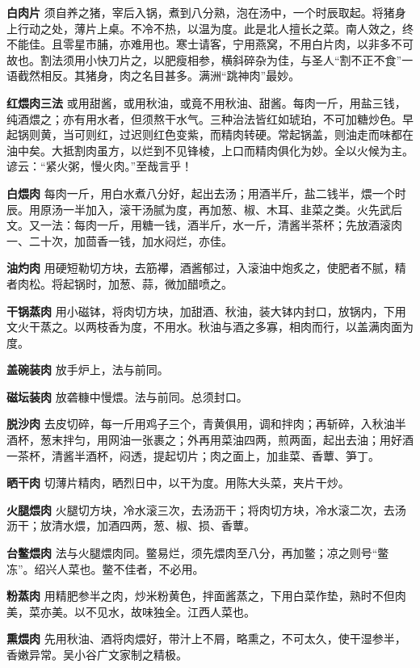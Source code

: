 \documentclass[]{article}
\begin{document}
\textbf{白肉片}
须自养之猪，宰后入锅，煮到八分熟，泡在汤中，一个时辰取起。将猪身上行动之处，薄片上桌。不冷不热，以温为度。此是北人擅长之菜。南人效之，终不能佳。且零星市脯，亦难用也。寒士请客，宁用燕窝，不用白片肉，以非多不可故也。割法须用小快刀片之，以肥瘦相参，横斜碎杂为佳，与圣人``割不正不食''一语截然相反。其猪身，肉之名目甚多。满洲``跳神肉''最妙。

\textbf{红煨肉三法}
或用甜酱，或用秋油，或竟不用秋油、甜酱。每肉一斤，用盐三钱，纯酒煨之；亦有用水者，但须熬干水气。三种治法皆红如琥珀，不可加糖炒色。早起锅则黄，当可则红，过迟则红色变紫，而精肉转硬。常起锅盖，则油走而味都在油中矣。大抵割肉虽方，以烂到不见锋棱，上口而精肉俱化为妙。全以火候为主。谚云：``紧火粥，慢火肉。''至哉言乎！

\textbf{白煨肉}
每肉一斤，用白水煮八分好，起出去汤；用酒半斤，盐二钱半，煨一个时辰。用原汤一半加入，滚干汤腻为度，再加葱、椒、木耳、韭菜之类。火先武后文。又一法：每肉一斤，用糖一钱，酒半斤，水一斤，清酱半茶杯；先放酒滚肉一、二十次，加茴香一钱，加水闷烂，亦佳。

\textbf{油灼肉}
用硬短勒切方块，去筋襻，酒酱郁过，入滚油中炮炙之，使肥者不腻，精者肉松。将起锅时，加葱、蒜，微加醋喷之。

\textbf{干锅蒸肉}
用小磁钵，将肉切方块，加甜酒、秋油，装大钵内封口，放锅内，下用文火干蒸之。以两枝香为度，不用水。秋油与酒之多寡，相肉而行，以盖满肉面为度。

\textbf{盖碗装肉} 放手炉上，法与前同。

\textbf{磁坛装肉} 放砻糠中慢煨。法与前同。总须封口。

\textbf{脱沙肉}
去皮切碎，每一斤用鸡子三个，青黄俱用，调和拌肉；再斩碎，入秋油半酒杯，葱末拌匀，用网油一张裹之；外再用菜油四两，煎两面，起出去油；用好酒一茶杯，清酱半酒杯，闷透，提起切片；肉之面上，加韭菜、香蕈、笋丁。

\textbf{晒干肉} 切薄片精肉，晒烈日中，以干为度。用陈大头菜，夹片干炒。

\textbf{火腿煨肉}
火腿切方块，冷水滚三次，去汤沥干；将肉切方块，冷水滚二次，去汤沥干；放清水煨，加酒四两，葱、椒、损、香蕈。

\textbf{台鳖煨肉}
法与火腿煨肉同。鳖易烂，须先煨肉至八分，再加鳖；凉之则号``鳖冻''。绍兴人菜也。鳖不佳者，不必用。

\textbf{粉蒸肉}
用精肥参半之肉，炒米粉黄色，拌面酱蒸之，下用白菜作垫，熟时不但肉美，菜亦美。以不见水，故味独全。江西人菜也。

\textbf{熏煨肉}
先用秋油、酒将肉煨好，带汁上不屑，略熏之，不可太久，使干湿参半，香嫩异常。吴小谷广文家制之精极。
\end{document}
